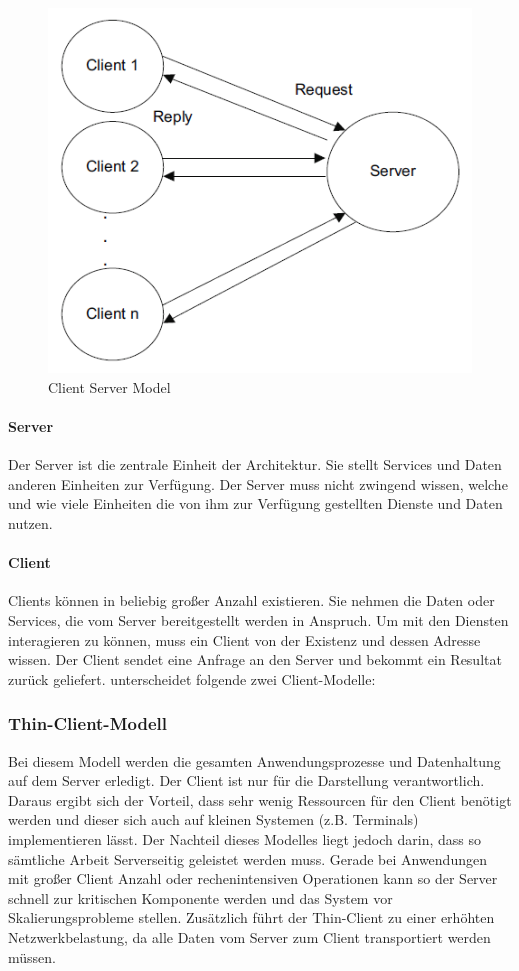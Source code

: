 	\begin{figure}[h]
		\centering
		\includegraphics[width=0.7\linewidth]{images/Clients-und-Server}
		\caption{Client Server Model}
		\label{fig:client-server}
	\end{figure}
	
	\paragraph{Server}
	Der Server ist die zentrale Einheit der Architektur. Sie stellt Services und Daten anderen Einheiten zur Verfügung. Der Server muss nicht zwingend wissen, welche und wie viele Einheiten die von ihm zur Verfügung gestellten Dienste und Daten nutzen.
	
	\paragraph{Client}
	Clients können in beliebig großer Anzahl existieren. Sie nehmen die Daten oder Services, die vom Server bereitgestellt werden in Anspruch. Um mit den Diensten interagieren zu können, muss ein Client von der Existenz und dessen Adresse wissen. Der Client sendet eine Anfrage an den Server und bekommt ein Resultat zurück geliefert. \citet*[S. 302]{Sommerville.2007} unterscheidet folgende zwei Client-Modelle:
	\subsubsection{Thin-Client-Modell}
	Bei diesem Modell werden die gesamten Anwendungsprozesse und Datenhaltung auf dem Server erledigt. Der Client ist nur für die Darstellung verantwortlich. Daraus ergibt sich der Vorteil, dass sehr wenig Ressourcen für den Client benötigt werden und dieser sich auch auf kleinen Systemen (z.B. Terminals) implementieren lässt. Der Nachteil dieses Modelles liegt jedoch darin, dass so sämtliche Arbeit Serverseitig geleistet werden muss. Gerade bei Anwendungen mit großer Client Anzahl oder rechenintensiven Operationen kann so der Server schnell zur kritischen Komponente werden und das System vor Skalierungsprobleme stellen. Zusätzlich führt der Thin-Client zu einer erhöhten Netzwerkbelastung, da alle Daten vom Server zum Client transportiert werden müssen.
	
